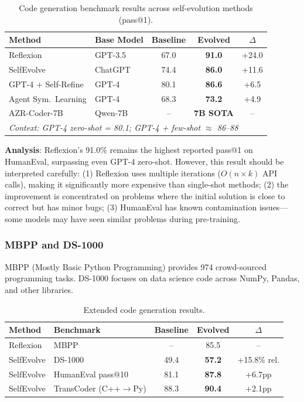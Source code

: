 \begin{table}[htbp]
\centering
\caption{Code generation benchmark results across self-evolution methods (pass@1).}
\label{tab:humaneval-results}
\begin{tabular}{llccc}
\toprule
\textbf{Method} & \textbf{Base Model} & \textbf{Baseline} & \textbf{Evolved} & \textbf{$\Delta$} \\
\midrule
Reflexion & GPT-3.5 & 67.0 & \textbf{91.0} & +24.0 \\
SelfEvolve & ChatGPT & 74.4 & \textbf{86.0} & +11.6 \\
GPT-4 + Self-Refine & GPT-4 & 80.1 & \textbf{86.6} & +6.5 \\
Agent Sym.\ Learning & GPT-4 & 68.3 & \textbf{73.2} & +4.9 \\
AZR-Coder-7B & Qwen-7B & -- & \textbf{7B SOTA} & -- \\
\midrule
\multicolumn{5}{l}{\textit{Context: GPT-4 zero-shot = 80.1; GPT-4 + few-shot $\approx$ 86--88}} \\
\bottomrule
\end{tabular}
\end{table}

\textbf{Analysis}: Reflexion's 91.0\% remains the highest reported pass@1 on HumanEval, surpassing even GPT-4 zero-shot. However, this result should be interpreted carefully: (1) Reflexion uses multiple iterations ($O(n \times k)$ API calls), making it significantly more expensive than single-shot methods; (2) the improvement is concentrated on problems where the initial solution is close to correct but has minor bugs; (3) HumanEval has known contamination issues---some models may have seen similar problems during pre-training.

\subsubsection{MBPP and DS-1000}

MBPP (Mostly Basic Python Programming) provides 974 crowd-sourced programming tasks. DS-1000 focuses on data science code across NumPy, Pandas, and other libraries.

\begin{table}[htbp]
\centering
\caption{Extended code generation results.}
\label{tab:extended-code}
\begin{tabular}{llccc}
\toprule
\textbf{Method} & \textbf{Benchmark} & \textbf{Baseline} & \textbf{Evolved} & \textbf{$\Delta$} \\
\midrule
Reflexion & MBPP & -- & 85.5 & -- \\
SelfEvolve & DS-1000 & 49.4 & \textbf{57.2} & +15.8\% rel. \\
SelfEvolve & HumanEval pass@10 & 81.1 & \textbf{87.8} & +6.7pp \\
SelfEvolve & TransCoder (C++$\to$Py) & 88.3 & \textbf{90.4} & +2.1pp \\
\bottomrule
\end{tabular}
\end{table}

